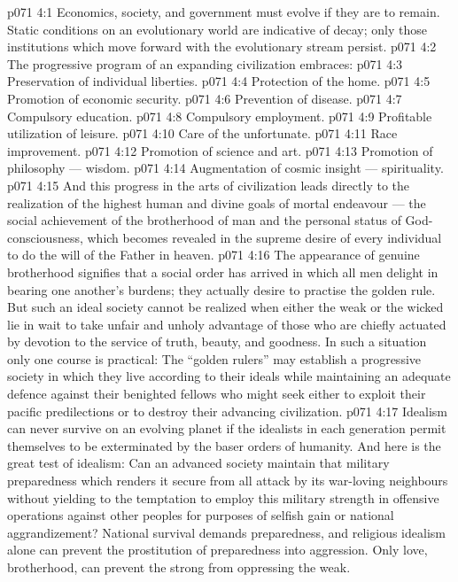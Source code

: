 \vs p071 4:1 Economics, society, and government must evolve if they are to remain. Static conditions on an evolutionary world are indicative of decay; only those institutions which move forward with the evolutionary stream persist.
\vs p071 4:2 \pc The progressive program of an expanding civilization embraces:
\vs p071 4:3 \bibnobreakspace Preservation of individual liberties.
\vs p071 4:4 \bibnobreakspace Protection of the home.
\vs p071 4:5 \bibnobreakspace Promotion of economic security.
\vs p071 4:6 \bibnobreakspace Prevention of disease.
\vs p071 4:7 \bibnobreakspace Compulsory education.
\vs p071 4:8 \bibnobreakspace Compulsory employment.
\vs p071 4:9 \bibnobreakspace Profitable utilization of leisure.
\vs p071 4:10 \bibnobreakspace Care of the unfortunate.
\vs p071 4:11 \bibnobreakspace Race improvement.
\vs p071 4:12 \bibnobreakspace Promotion of science and art.
\vs p071 4:13 \bibnobreakspace Promotion of philosophy --- wisdom.
\vs p071 4:14 \bibnobreakspace Augmentation of cosmic insight --- spirituality.
\vs p071 4:15 \pc And this progress in the arts of civilization leads directly to the realization of the highest human and divine goals of mortal endeavour --- the social achievement of the brotherhood of man and the personal status of God\hyp{}consciousness, which becomes revealed in the supreme desire of every individual to do the will of the Father in heaven.
\vs p071 4:16 The appearance of genuine brotherhood signifies that a social order has arrived in which all men delight in bearing one another’s burdens; they actually desire to practise the golden rule. But such an ideal society cannot be realized when either the weak or the wicked lie in wait to take unfair and unholy advantage of those who are chiefly actuated by devotion to the service of truth, beauty, and goodness. In such a situation only one course is practical: The “golden rulers” may establish a progressive society in which they live according to their ideals while maintaining an adequate defence against their benighted fellows who might seek either to exploit their pacific predilections or to destroy their advancing civilization.
\vs p071 4:17 Idealism can never survive on an evolving planet if the idealists in each generation permit themselves to be exterminated by the baser orders of humanity. And here is the great test of idealism: Can an advanced society maintain that military preparedness which renders it secure from all attack by its war\hyp{}loving neighbours without yielding to the temptation to employ this military strength in offensive operations against other peoples for purposes of selfish gain or national aggrandizement? National survival demands preparedness, and religious idealism alone can prevent the prostitution of preparedness into aggression. Only love, brotherhood, can prevent the strong from oppressing the weak.
